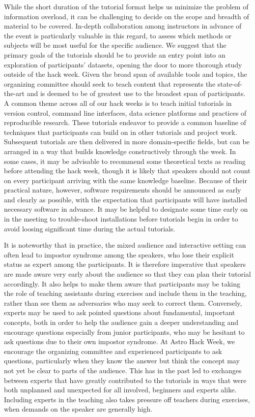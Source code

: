 \documentclass{nature}
\begin{document}
While the short duration of the tutorial format helps us minimize the problem of information overload, it can be challenging to decide on the scope and breadth of material to be covered. In-depth collaboration among instructors in advance of the event is particularly valuable in this regard, to assess which methods or subjects will be most useful for the specific audience. We suggest that the primary goals of the tutorials should be to provide an entry point into an exploration of participants' datasets, opening the door to more thorough study outside of the hack week. Given the broad span of available tools and topics, the organizing committee should seek to teach content that represents the state-of-the-art and is deemed to be of greatest use to the broadest span of participants. A common theme across all of our hack weeks is to teach initial tutorials in version control, command line interfaces, data science platforms and practices of reproducible research. These tutorials endeavor to provide a common baseline of techniques that participants can build on in other tutorials and project work. Subsequent tutorials are then delivered in more domain-specific fields, but can be arranged in a way that builds knowledge constructively through the week. In some cases, it may be advisable to recommend some theoretical texts as reading before attending the hack week, though it is likely that speakers should not count on every participant arriving with the same knowledge baseline. Because of their practical nature, however, software requirements should be announced as early and clearly as possible, with the expectation that participants will have installed necessary software in advance. It may be helpful to designate some time early on in the meeting to trouble-shoot installations before tutorials begin in order to avoid loosing significant time during the actual tutorials.

It is noteworthy that in practice, the mixed audience and interactive setting can often lead to impostor syndrome among the speakers, who lose their explicit status as expert among the participants. It is therefore imperative that speakers are made aware very early about the audience so that they can plan their tutorial accordingly. It also helps to make them aware that participants may be taking the role of teaching assistants during exercises and include them in the teaching, rather than see them as adversaries who may seek to correct them. Conversely, experts may be used to ask pointed questions about fundamental, important concepts, both in order to help the audience gain a deeper understanding and encourage questions especially from junior participants, who may be hesitant to ask questions due to their own impostor syndrome. At Astro Hack Week, we encourage the organizing committee and experienced participants to ask questions, particularly when they know the answer but think the concept may not yet be clear to parts of the audience. This has in the past led to exchanges between experts that have greatly contributed to the tutorials in ways that were both unplanned and unexpected for all involved, beginners and experts alike. Including experts in the teaching also takes pressure off teachers during exercises, when demands on the speaker are generally high.
\end{document}
